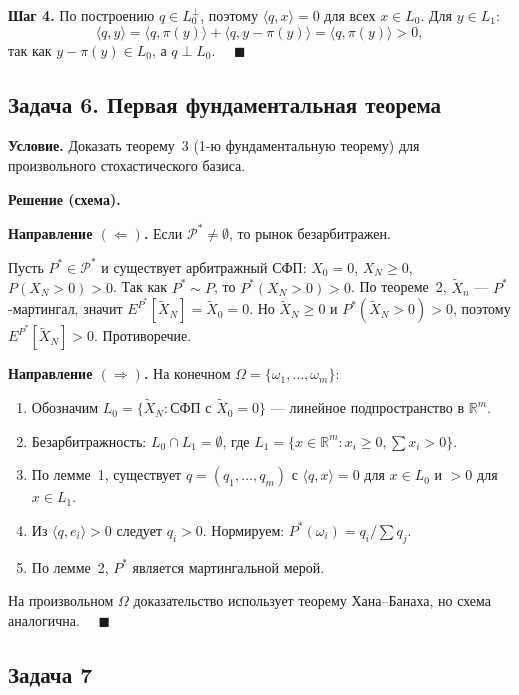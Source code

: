 \documentclass[12pt,a4paper]{article}
\theoremstyle{zadacha}
\begin{document}
\textbf{Шаг 4.} По построению $q \in L_0^\perp$, поэтому $\langle q, x \rangle = 0$ для всех $x \in L_0$.
Для $y \in L_1$:
\[
\langle q, y \rangle = \langle q, \pi(y) \rangle + \langle q, y - \pi(y) \rangle = \langle q, \pi(y) \rangle > 0,
\]
так как $y - \pi(y) \in L_0$, а $q \perp L_0$. $\quad\blacksquare$

\subsection*{Задача 6. Первая фундаментальная теорема}

\textbf{Условие.} Доказать теорему~3 (1-ю фундаментальную теорему) для произвольного стохастического базиса.

\medskip
\textbf{Решение (схема).}

\textbf{Направление $(\Leftarrow)$.} Если $\mathcal{P}^* \neq \emptyset$, то рынок безарбитражен.

Пусть $P^* \in \mathcal{P}^*$ и существует арбитражный СФП: $X_0 = 0$, $X_N \geq 0$, $P(X_N > 0) > 0$.
Так как $P^* \sim P$, то $P^*(X_N > 0) > 0$. По теореме~2, $\tilde{X}_n$ --- $P^*$-мартингал, значит $E^{P^*}[\tilde{X}_N] = \tilde{X}_0 = 0$.
Но $\tilde{X}_N \geq 0$ и $P^*(\tilde{X}_N > 0) > 0$, поэтому $E^{P^*}[\tilde{X}_N] > 0$. Противоречие.

\textbf{Направление $(\Rightarrow)$.} На конечном $\Omega = \{\omega_1, \ldots, \omega_m\}$:

\begin{enumerate}
  \item Обозначим $L_0 = \{\tilde{X}_N : \text{СФП с } \tilde{X}_0 = 0\}$ --- линейное подпространство в $\mathbb{R}^m$.
  \item Безарбитражность: $L_0 \cap L_1 = \emptyset$, где $L_1 = \{x \in \mathbb{R}^m : x_i \geq 0, \sum x_i > 0\}$.
  \item По лемме~1, существует $q = (q_1, \ldots, q_m)$ с $\langle q, x \rangle = 0$ для $x \in L_0$ и $> 0$ для $x \in L_1$.
  \item Из $\langle q, e_i \rangle > 0$ следует $q_i > 0$. Нормируем: $P^*(\omega_i) = q_i / \sum q_j$.
  \item По лемме~2, $P^*$ является мартингальной мерой.
\end{enumerate}

На произвольном $\Omega$ доказательство использует теорему Хана--Банаха, но схема аналогична. $\quad\blacksquare$

\subsection*{Задача 7}
\end{document}
